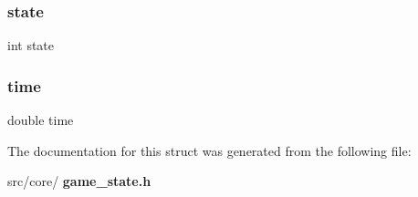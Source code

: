 \mbox{\label{structgame__state_a89f234133d3efe315836311cbf21c64b}} 
\subsubsection{state}
{\footnotesize\ttfamily int state}

\mbox{\label{structgame__state_ab2d5aa7fce1a14d8bddfb2c333ea9679}} 
\subsubsection{time}
{\footnotesize\ttfamily double time}



The documentation for this struct was generated from the following file\+:\begin{DoxyCompactItemize}
\item 
src/core/\textbf{ game\+\_\+state.\+h}\end{DoxyCompactItemize}
